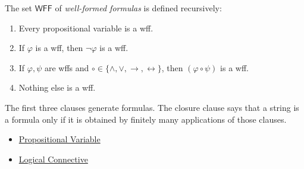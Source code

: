 \begin{tcolorbox}[colback=propbox, colframe=propborder, arc=2pt,
  left=6pt, right=6pt, top=4pt, bottom=4pt,
  title={\small\textbf{Definition (Well-Formed Formula)}},
  fonttitle=\small\bfseries]
\label{def:well-formed-formula}
The set $\mathsf{WFF}$ of \emph{well-formed formulas} is defined recursively:
\begin{enumerate}
  \item Every propositional variable is a wff.
  \item If $\varphi$ is a wff, then $\neg\varphi$ is a wff.
  \item If $\varphi,\psi$ are wffs and
        $\circ\in\{\land,\lor,\to,\leftrightarrow\}$, then
        $(\varphi\circ\psi)$ is a wff.
  \item Nothing else is a wff.
\end{enumerate}
\end{tcolorbox}

\begin{remark*}[Interpretation]
The first three clauses generate formulas. The closure clause says that a string
is a formula only if it is obtained by finitely many applications of those
clauses.
\end{remark*}

\begin{dependencies}
\begin{itemize}
  \item \hyperref[def:propositional-variable]{Propositional Variable}
  \item \hyperref[def:logical-connective]{Logical Connective}
\end{itemize}
\end{dependencies}
